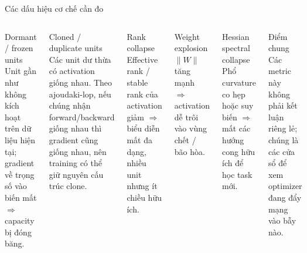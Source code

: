 \documentclass[8pt,aspectratio=169]{beamer}
\begin{document}
\begin{frame}{Các dấu hiệu cơ chế cần đo}
\small
\begin{columns}[T]
\begin{alertblock}{Dormant / frozen units}
Unit gần như không kích hoạt trên dữ liệu hiện tại; gradient về trọng số vào biến mất $\Rightarrow$ capacity bị đóng băng.
\end{alertblock}

\begin{alertblock}{Cloned / duplicate units}
Các unit dư thừa có activation giống nhau. Theo ajoudaki-lop, nếu chúng nhận forward/backward giống nhau thì gradient cũng giống nhau, nên training có thể giữ nguyên cấu trúc clone.
\end{alertblock}

\begin{alertblock}{Rank collapse}
Effective rank / stable rank của activation giảm $\Rightarrow$ biểu diễn mất đa dạng, nhiều unit nhưng ít chiều hữu ích.
\end{alertblock}

\begin{alertblock}{Weight explosion}
$\|W\|$ tăng mạnh $\Rightarrow$ activation dễ trôi vào vùng chết / bão hòa.
\end{alertblock}

\begin{alertblock}{Hessian spectral collapse}
Phổ curvature co hẹp hoặc suy biến $\Rightarrow$ mất các hướng cong hữu ích để học task mới.
\end{alertblock}

\begin{exampleblock}{Điểm chung}
Các metric này không phải kết luận riêng lẻ; chúng là các cửa sổ để xem optimizer đang đẩy mạng vào bẫy nào.
\end{exampleblock}
\end{columns}
\end{frame}
\end{document}
